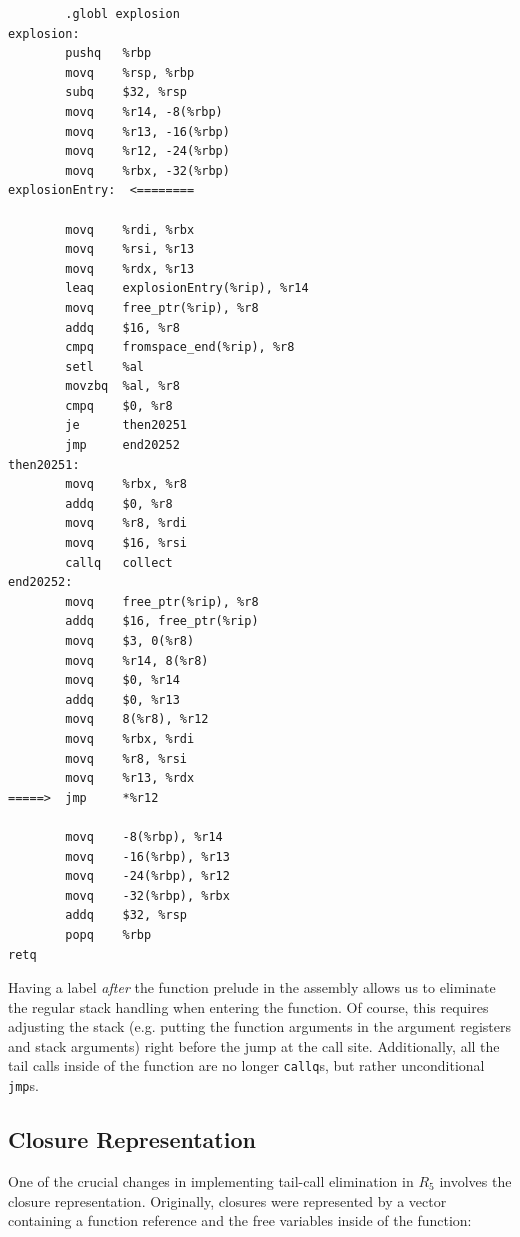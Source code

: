\documentclass[12pt]{article}
\begin{document}
\begin{multicols}{2}
\begin{verbatim}
        .globl explosion
explosion:
        pushq   %rbp
        movq    %rsp, %rbp
        subq    $32, %rsp
        movq    %r14, -8(%rbp)
        movq    %r13, -16(%rbp)
        movq    %r12, -24(%rbp)
        movq    %rbx, -32(%rbp)
explosionEntry:  <========

        movq    %rdi, %rbx
        movq    %rsi, %r13
        movq    %rdx, %r13
        leaq    explosionEntry(%rip), %r14
        movq    free_ptr(%rip), %r8
        addq    $16, %r8
        cmpq    fromspace_end(%rip), %r8
        setl    %al
        movzbq  %al, %r8
        cmpq    $0, %r8
        je      then20251
        jmp     end20252
then20251:
        movq    %rbx, %r8
        addq    $0, %r8
        movq    %r8, %rdi
        movq    $16, %rsi
        callq   collect
end20252:
        movq    free_ptr(%rip), %r8
        addq    $16, free_ptr(%rip)
        movq    $3, 0(%r8)
        movq    %r14, 8(%r8)
        movq    $0, %r14
        addq    $0, %r13
        movq    8(%r8), %r12
        movq    %rbx, %rdi
        movq    %r8, %rsi
        movq    %r13, %rdx
=====>  jmp     *%r12

        movq    -8(%rbp), %r14
        movq    -16(%rbp), %r13
        movq    -24(%rbp), %r12
        movq    -32(%rbp), %rbx
        addq    $32, %rsp
        popq    %rbp
retq	
\end{verbatim}
\end{multicols}

Having a label \emph{after} the function prelude in the assembly allows us to
eliminate the regular stack handling when entering the function. Of course, this
requires adjusting the stack (e.g. putting the
function arguments in the argument registers and stack arguments) right before
the jump at the call site. Additionally, all the tail calls inside of the function
are no longer \verb+callq+s, but rather unconditional \verb+jmp+s.

\subsection{Closure Representation}

One of the crucial changes in implementing tail-call elimination in
$R_5$ involves the closure representation. Originally, closures were
represented by a vector containing a function reference and the free variables
inside of the function:
\end{document}
